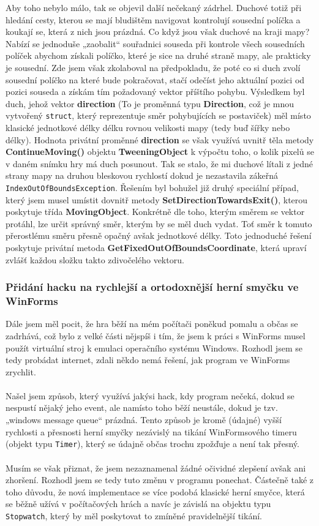 \documentclass[a4]{article}
\begin{document}
Aby toho nebylo málo, tak se objevil další nečekaný zádrhel. Duchové totiž při hledání cesty, kterou se mají bludištěm navigovat kontrolují sousední políčka a koukají se, která z nich jsou prázdná. Co když jsou však duchové na kraji mapy? Nabízí se jednoduše „zaobalit“ souřadnici souseda při kontrole všech sousedních políček abychom získali políčko, které je sice na druhé straně mapy, ale prakticky je sousední. Zde jsem však zkolaboval na předpokladu, že poté co si duch zvolí sousední políčko na které bude pokračovat, stačí odečíst jeho aktuální pozici od pozici souseda a získám tím požadovaný vektor příštího pohybu. Výsledkem byl duch, jehož vektor \textbf{direction} (To je proměnná typu \textbf{Direction}, což je mnou vytvořený \verb|struct|, který reprezentuje směr pohybujících se postaviček) měl místo klasické jednotkové délky délku rovnou velikosti mapy (tedy buď šířky nebo délky). Hodnota privátní proměnné \textbf{direction} se však využívá uvnitř těla metody \textbf{ContinueMoving()} objektu \textbf{TweeningObject} k výpočtu toho, o kolik pixelů se v daném snímku hry má duch posunout. Tak se stalo, že mi duchové lítali z jedné strany mapy na druhou bleskovou rychlostí dokud je nezastavila zákeřná \verb|IndexOutOfBoundsException|. Řešením byl bohužel již druhý speciální případ, který jsem musel umístit dovnitř metody \textbf{SetDirectionTowardsExit()}, kterou poskytuje třída \textbf{MovingObject}. Konkrétně dle toho, kterým směrem se vektor protáhl, lze určit správný směr, kterým by se měl duch vydat. Toť směr k tomuto přerostlému směru přesně opačný avšak jednotkové délky. Toto jednoduché řešení poskytuje privátní metoda \textbf{GetFixedOutOfBoundsCoordinate}, která upraví zvlášť každou složku takto zdivočelého vektoru.
\subsubsection{Přidání hacku na rychlejší a ortodoxnější herní smyčku ve WinForms}
Dále jsem měl pocit, že hra běží na mém počítači poněkud pomalu a občas se zadrhává, což bylo z velké části nějspíš i tím, že jsem k práci s WinForms musel použít virtuální stroj k emulaci operačního systému Windows. Rozhodl jsem se tedy probádat internet, zdali někdo nemá řešení, jak program ve WinForms zrychlit. 
\\\\
Našel jsem způsob, který využívá jakýsi hack, kdy program nečeká, dokud se nespustí nějaký jeho event, ale namísto toho běží neustále, dokud je tzv. „windows message queue“ prázdná. Tento způsob je kromě (údajné) vyšší rychlosti a přesnosti herní smyčky nezávislý na tikání WinFormsového timeru (objekt typu \verb|Timer|), který se údajně občas trochu zpožďuje a není tak přesný. 
\\\\
Musím se však přiznat, že jsem nezaznamenal žádné očividné zlepšení avšak ani zhoršení. Rozhodl jsem se tedy tuto změnu v programu ponechat. Částečně také z toho důvodu, že nová implementace se více podobá klasické herní smyčce, která se běžně užívá v počítačových hrách a navíc je závislá na objektu typu \verb|Stopwatch|, který by měl poskytovat to zmíněné pravidelnější tikání.
\end{document}
